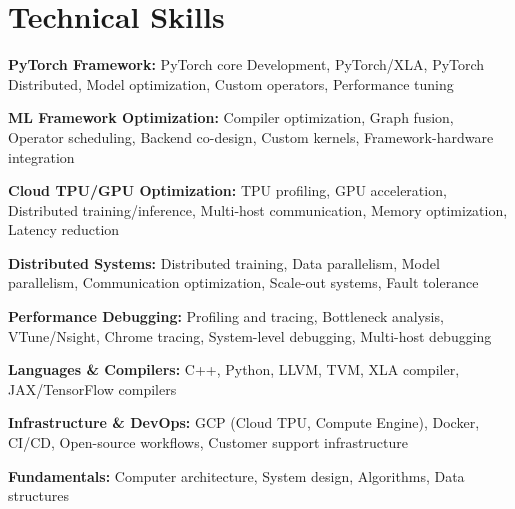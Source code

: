 \documentclass[10pt, letterpaper]{article}
\begin{document}
\section{Technical Skills}
 \begin{itemize}[leftmargin=0.12in, label={}]
    \small{\item{
     \textbf{PyTorch Framework:} PyTorch core Development, PyTorch/XLA, PyTorch Distributed, Model optimization, Custom operators, Performance tuning
    }}
    \small{\item{
     \textbf{ML Framework Optimization:} Compiler optimization, Graph fusion, Operator scheduling, Backend co-design, Custom kernels, Framework-hardware integration
    }}
    \small{\item{
     \textbf{Cloud TPU/GPU Optimization:} TPU profiling, GPU acceleration, Distributed training/inference, Multi-host communication, Memory optimization, Latency reduction
    }}
    \small{\item{
     \textbf{Distributed Systems:} Distributed training, Data parallelism, Model parallelism, Communication optimization, Scale-out systems, Fault tolerance
    }}
    \small{\item{
     \textbf{Performance Debugging:} Profiling and tracing, Bottleneck analysis, VTune/Nsight, Chrome tracing, System-level debugging, Multi-host debugging
    }}
    \small{\item{
     \textbf{Languages \& Compilers:} C++, Python, LLVM, TVM, XLA compiler, JAX/TensorFlow compilers
    }}
    \small{\item{
     \textbf{Infrastructure \& DevOps:} GCP (Cloud TPU, Compute Engine), Docker, CI/CD, Open-source workflows, Customer support infrastructure
    }}
    \small{\item{
     \textbf{Fundamentals:} Computer architecture, System design, Algorithms, Data structures
    }}
 \end{itemize}
\end{document}
